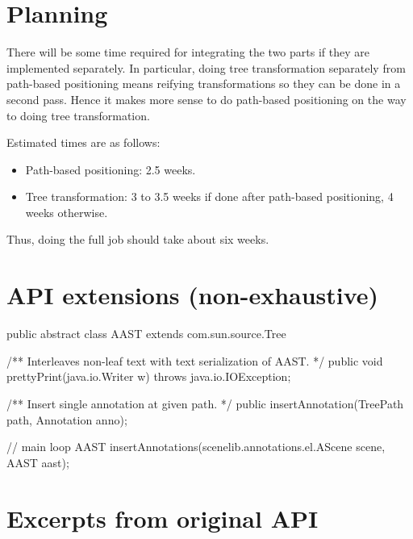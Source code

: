 \documentclass{article}
\newenvironment{jcode}{\footnotesize\verbatim}{\endverbatim\normalsize}
\begin{document}
\section{Planning}

There will be some time required for integrating the two parts if they
are implemented separately.  In particular, doing tree transformation
separately from path-based positioning means reifying transformations
so they can be done in a second pass.  Hence it makes more sense to
do path-based positioning on the way to doing tree transformation.

Estimated times are as follows:
\begin{itemize}
\item  Path-based positioning: 2.5 weeks.
\item  Tree transformation: 3 to 3.5 weeks if done after path-based
positioning, 4 weeks otherwise.
\end{itemize}
Thus, doing the full job should take about six weeks.

\appendix

\section{API extensions (non-exhaustive)}

\begin{jcode}
public abstract class AAST extends com.sun.source.Tree {
  /** Interleaves non-leaf text with text serialization of AAST. */
  public void prettyPrint(java.io.Writer w) throws java.io.IOException;

  /** Insert single annotation at given path. */
  public insertAnnotation(TreePath path, Annotation anno);
}

// main loop
AAST insertAnnotations(scenelib.annotations.el.AScene scene, AAST aast);
\end{jcode}

\newpage
\section{Excerpts from original API}\label{sec:exc}
\end{document}
